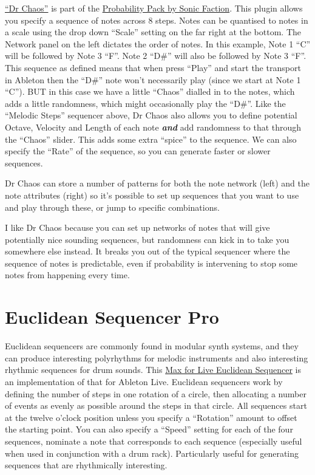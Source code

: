 \documentclass[
  12pt,
  letterpaper,
  oneside,
  open=any]{scrbook}
\makeatletter
\newcommand*\pandocbounded[1]{%
  \sbox\pandoc@box{#1}%
  \Gscale@div\@tempa{\textheight}{\dimexpr\ht\pandoc@box+\dp\pandoc@box\relax}%
  \Gscale@div\@tempb{\linewidth}{\wd\pandoc@box}%
  \ifdim\@tempb\p@<\@tempa\p@\let\@tempa\@tempb\fi%
  \ifdim\@tempa\p@<\p@\scalebox{\@tempa}{\usebox\pandoc@box}%
  \else\usebox{\pandoc@box}%
  \fi%
}
\makeatother
\begin{document}
\href{https://www.youtube.com/watch?v=ELMM0IxNVAk}{``Dr Chaos''} is part
of the
\href{https://www.ableton.com/en/packs/probability-pack/}{Probability
Pack by Sonic Faction}. This plugin allows you specify a sequence of
notes across 8 steps. Notes can be quantised to notes in a scale using
the drop down ``Scale'' setting on the far right at the bottom. The
Network panel on the left dictates the order of notes. In this example,
Note 1 ``C'' will be followed by Note 3 ``F''. Note 2 ``D\#'' will also
be followed by Note 3 ``F''. This sequence as defined means that when
press ``Play'' and start the transport in Ableton then the ``D\#'' note
won't necessarily play (since we start at Note 1 ``C''). BUT in this
case we have a little ``Chaos'' dialled in to the notes, which adds a
little randomness, which might occasionally play the ``D\#''. Like the
``Melodic Steps'' sequencer above, Dr Chaos also allows you to define
potential Octave, Velocity and Length of each note \textbf{\emph{and}}
add randomness to that through the ``Chaos'' slider. This adds some
extra ``spice'' to the sequence. We can also specify the ``Rate'' of the
sequence, so you can generate faster or slower sequences.

Dr Chaos can store a number of patterns for both the note network (left)
and the note attributes (right) so it's possible to set up sequences
that you want to use and play through these, or jump to specific
combinations.

I like Dr Chaos because you can set up networks of notes that will give
potentially nice sounding sequences, but randomness can kick in to take
you somewhere else instead. It breaks you out of the typical sequencer
where the sequence of notes is predictable, even if probability is
intervening to stop some notes from happening every time.

\pandocbounded{\texttt{[image: images/Dr\_Chaos.png]}}

\section{Euclidean Sequencer Pro}\label{euclidean-sequencer-pro}

Euclidean sequencers are commonly found in modular synth systems, and
they can produce interesting polyrhythms for melodic instruments and
also interesting rhythmic sequences for drum sounds. This
\href{https://maxforlive.com/library/device/7608/euclidean-sequencer-pro}{Max
for Live Euclidean Sequencer} is an implementation of that for Ableton
Live. Euclidean sequencers work by defining the number of steps in one
rotation of a circle, then allocating a number of events as evenly as
possible around the steps in that circle. All sequences start at the
twelve o'clock position unless you specify a ``Rotation'' amount to
offset the starting point. You can also specify a ``Speed'' setting for
each of the four sequences, nominate a note that corresponds to each
sequence (especially useful when used in conjunction with a drum rack).
Particularly useful for generating sequences that are rhythmically
interesting.
\end{document}

